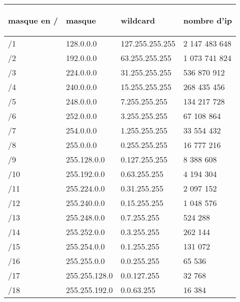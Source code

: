 \documentclass[a4paper]{article}
\begin{document}
\begin{center}
    \begin{tabular}{|p{3.75cm}|p{3.75cm}|p{3.75cm}|p{3.75cm}|} \hline
        \begin{center} \textbf{masque en /} \end{center} &
        \begin{center} \textbf{masque} \end{center} &
        \begin{center} \textbf{wildcard} \end{center} &
        \begin{center} \textbf{nombre d'ip} \end{center}
        \\ \hline
        /1 &  128.0.0.0 & 127.255.255.255 & 2 147 483 648 \\ \hline
        /2 &  192.0.0.0 & 63.255.255.255  & 1 073 741 824 \\ \hline
        /3 &  224.0.0.0 & 31.255.255.255  & 536 870 912 \\ \hline
        /4 &  240.0.0.0 & 15.255.255.255  & 268 435 456 \\ \hline
        /5 &  248.0.0.0 & 7.255.255.255   & 134 217 728 \\ \hline
        /6 &  252.0.0.0 & 3.255.255.255   & 67 108 864 \\ \hline
        /7 &  254.0.0.0 & 1.255.255.255   & 33 554 432 \\ \hline
        /8 &  255.0.0.0 & 0.255.255.255   & 16 777 216 \\ \hline
        /9 &  255.128.0.0 & 0.127.255.255 & 8 388 608 \\ \hline
        /10 & 255.192.0.0 & 0.63.255.255  & 4 194 304 \\ \hline
        /11 & 255.224.0.0 & 0.31.255.255  & 2 097 152 \\ \hline
        /12 & 255.240.0.0 & 0.15.255.255  & 1 048 576 \\ \hline
        /13 & 255.248.0.0 & 0.7.255.255   & 524 288 \\ \hline
        /14 & 255.252.0.0 & 0.3.255.255   & 262 144 \\ \hline
        /15 & 255.254.0.0 & 0.1.255.255   & 131 072 \\ \hline
        /16 & 255.255.0.0 & 0.0.255.255   & 65 536 \\ \hline
        /17 & 255.255.128.0 & 0.0.127.255 & 32 768 \\ \hline
        /18 & 255.255.192.0 & 0.0.63.255  & 16 384 \\ \hline

\end{tabular}
\end{center}
\end{document}

